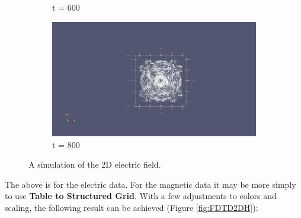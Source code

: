 \begin{figure}[h!]
\begin{subfigure}{.49\textwidth}
    	\caption{t = 600}
    \end{subfigure}
    \begin{subfigure}{.49\textwidth}
    	\centering
    	\includegraphics[width=.95\linewidth]{Figures/FDTD2DE4}
    	\caption{t = 800}
    \end{subfigure}
	\decoRule
	\caption[2D Electric Field Simulation]{A simulation of the 2D electric field.}
	\label{fig:FDTD2DE}
\end{figure}

The above is for the electric data. For the magnetic data it may be more simply to use \textbf{Table to Structured Grid}. With a few adjustments to colors and scaling, the following result can be achieved (Figure \ref{fig:FDTD2DH}):

